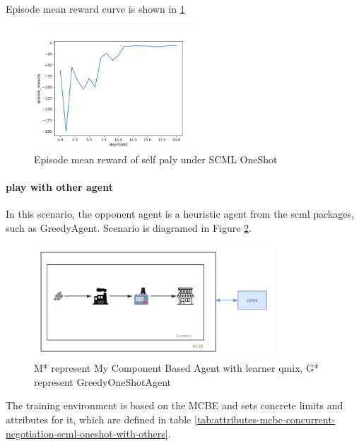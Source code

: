 Episode mean reward curve is shown in \ref{fig:oneshot-self-play}

\begin{figure}[htbp]
\centering
\includegraphics[width=0.55\textwidth]{./images/oneshot_self_play.png}
\caption{Episode mean reward of self paly under SCML OneShot}
\label{fig:oneshot-self-play}
\end{figure}

\paragraph{play with other agent} In this scenario, the opponent agent is a heuristic agent from the scml packages, such as GreedyAgent.
Scenario is diagramed in Figure \ref{fig:scenario-oneshot-scml-play-with-greedy}.
\begin{figure}[htbp]
\centering
\includegraphics[width=0.80\textwidth]{./images/scenario-oneshot-scml-play-with-greedy.png}
\caption{M* represent My Component Based Agent with learner \gls{qmix}, G* represent GreedyOneShotAgent}
\label{fig:scenario-oneshot-scml-play-with-greedy}
\end{figure}

The training environment is based on the MCBE and sets concrete limits and attributes for it,
which are defined in table \ref{tab:attributes-mcbe-concurrent-negotiation-scml-oneshot-with-others}.

